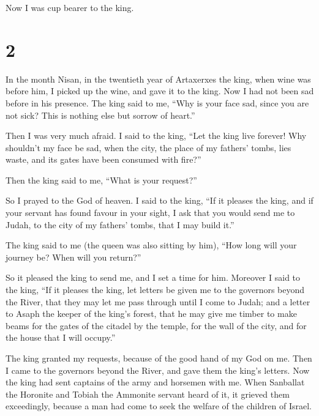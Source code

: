 Now I was cup bearer to the king.

\hypertarget{section-1}{%
\section{2}\label{section-1}}

 In the month Nisan, in the twentieth year of Artaxerxes
the king, when wine was before him, I picked up the wine, and gave it to
the king. Now I had not been sad before in his presence. 
The king said to me, ``Why is your face sad, since you are not sick?
This is nothing else but sorrow of heart.''

Then I was very much afraid.  I said to the king, ``Let
the king live forever! Why shouldn't my face be sad, when the city, the
place of my fathers' tombs, lies waste, and its gates have been consumed
with fire?''

 Then the king said to me, ``What is your request?''

So I prayed to the God of heaven.  I said to the king,
``If it pleases the king, and if your servant has found favour in your
sight, I ask that you would send me to Judah, to the city of my fathers'
tombs, that I may build it.''

 The king said to me (the queen was also sitting by him),
``How long will your journey be? When will you return?''

So it pleased the king to send me, and I set a time for him.
 Moreover I said to the king, ``If it pleases the king,
let letters be given me to the governors beyond the River, that they may
let me pass through until I come to Judah;  and a letter
to Asaph the keeper of the king's forest, that he may give me timber to
make beams for the gates of the citadel by the temple, for the wall of
the city, and for the house that I will occupy.''

The king granted my requests, because of the good hand of my God on me.
 Then I came to the governors beyond the River, and gave
them the king's letters. Now the king had sent captains of the army and
horsemen with me.  When Sanballat the Horonite and Tobiah
the Ammonite servant heard of it, it grieved them exceedingly, because a
man had come to seek the welfare of the children of Israel.

